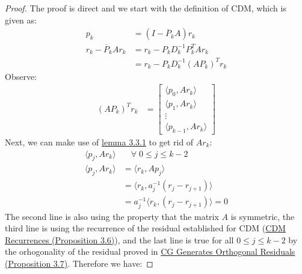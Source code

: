 \documentclass[]{article}
\theoremstyle{definition}
\begin{document}
            \begin{proof}
                The proof is direct and we start with the definition of CDM, which is given as: 
                \begin{align}
                    p_k &= (I - \overline{P}_kA)r_k
                    \\
                    r_k - \overline{P}_kAr_k &= 
                    r_k - P_kD^{-1}_kP^T_kAr_k
                    \\
                    &= r_k - P_kD^{-1}_k(AP_k)^Tr_k
                \end{align}
                Observe:
                \begin{align}
                    (AP_k)^Tr_k &= 
                    \begin{bmatrix}
                        \langle p_0, Ar_k\rangle
                        \\
                        \langle p_1, Ar_k\rangle
                        \\
                        \vdots
                        \\
                        \langle p_{k - 1}, Ar_k\rangle
                    \end{bmatrix}
                \end{align}
                Next, we can make use of \hyperref[lemma:CG_Lemma_1]{lemma 3.3.1} to get rid of $Ar_k$: 
                \begin{align}
                    \langle p_j, Ar_k\rangle& \quad \forall\; 0 \le j \le k -2 
                    \\
                    \langle p_j, Ar_k\rangle&= \langle r_k, Ap_j\rangle
                    \\
                    &= \langle r_k, a_j^{-1}(r_j - r_{j + 1})\rangle
                    \\
                    &= a_j^{-1}\langle r_k, (r_j - r_{j + 1})\rangle = 0
                \end{align}
                The second line is also using the property that the matrix $A$ is symmetric, the third line is using the recurrence of the residual established for CDM (\hyperref[prop:CDM_Recurrence]{CDM Recurrences (Proposition 3.6)}), and the last line is true for all $0 \le j \le k - 2$ by the orhogonality of the residual proved in \hyperref[prop:CG_Generates_Orthogonal_Residuals]{CG Generates Orthogonal Residuals (Proposition 3.7)}. Therefore we have: 
                

\end{proof}
\end{document}
